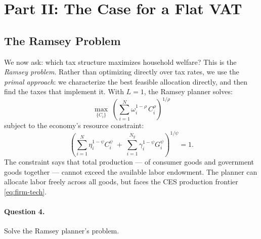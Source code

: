 \section{Part II: The Case for a Flat VAT}
\label{sec:optimal-baseline}
 
\subsection{The Ramsey Problem}
\label{subsec:ramsey-baseline}
 
We now ask: which tax structure maximizes household welfare? This is the \emph{Ramsey problem}. Rather than optimizing directly over tax rates, we use the \emph{primal approach}: we characterize the best feasible allocation directly, and then find the taxes that implement it. With $L = 1$, the Ramsey planner solves:
%
\begin{equation}
    \max_{\{C_i\}} \; \left( \sum_{i=1}^{N} \omega_i^{1-\rho}\, C_i^{\rho} \right)^{1/\rho}
    \label{eq:ramsey-baseline-obj}
\end{equation}
%
subject to the economy's resource constraint:
%
\begin{equation}
    \left( \sum_{i=1}^{N} \eta_i^{1-\psi} C_i^{\psi} \;+\; \sum_{i=1}^{N_g} \gamma_i^{1-\psi} G_i^{\psi} \right)^{1/\psi} = 1.
    \label{eq:ramsey-baseline-constraint}
\end{equation}
%
The constraint says that total production --- of consumer goods and government goods together --- cannot exceed the available labor endowment. The planner can allocate labor freely across all goods, but faces the CES production frontier \eqref{eq:firm-tech}.
 
\paragraph{Question 4.}
Solve the Ramsey planner's problem.
 
